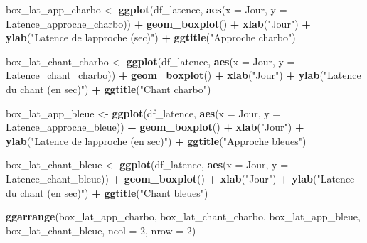 \documentclass[
  french,
]{article}
\newenvironment{Shaded}{\begin{snugshade}}{\end{snugshade}}
\newcommand{\AttributeTok}[1]{\textcolor[rgb]{0.13,0.29,0.53}{#1}}
\newcommand{\DecValTok}[1]{\textcolor[rgb]{0.00,0.00,0.81}{#1}}
\newcommand{\FunctionTok}[1]{\textcolor[rgb]{0.13,0.29,0.53}{\textbf{#1}}}
\newcommand{\NormalTok}[1]{#1}
\newcommand{\OtherTok}[1]{\textcolor[rgb]{0.56,0.35,0.01}{#1}}
\newcommand{\SpecialCharTok}[1]{\textcolor[rgb]{0.81,0.36,0.00}{\textbf{#1}}}
\newcommand{\StringTok}[1]{\textcolor[rgb]{0.31,0.60,0.02}{#1}}
\begin{document}
\begin{Shaded}
\begin{Highlighting}[]
\NormalTok{box\_lat\_app\_charbo }\OtherTok{\textless{}{-}} \FunctionTok{ggplot}\NormalTok{(df\_latence, }\FunctionTok{aes}\NormalTok{(}\AttributeTok{x =}\NormalTok{ Jour, }\AttributeTok{y =}\NormalTok{ Latence\_approche\_charbo)) }\SpecialCharTok{+}
  \FunctionTok{geom\_boxplot}\NormalTok{() }\SpecialCharTok{+}
  \FunctionTok{xlab}\NormalTok{(}\StringTok{"Jour"}\NormalTok{) }\SpecialCharTok{+}
  \FunctionTok{ylab}\NormalTok{(}\StringTok{"Latence de l\textquotesingle{}approche (sec)"}\NormalTok{) }\SpecialCharTok{+}
  \FunctionTok{ggtitle}\NormalTok{(}\StringTok{"Approche charbo"}\NormalTok{)}

\NormalTok{box\_lat\_chant\_charbo }\OtherTok{\textless{}{-}} \FunctionTok{ggplot}\NormalTok{(df\_latence, }\FunctionTok{aes}\NormalTok{(}\AttributeTok{x =}\NormalTok{ Jour, }\AttributeTok{y =}\NormalTok{ Latence\_chant\_charbo)) }\SpecialCharTok{+}
  \FunctionTok{geom\_boxplot}\NormalTok{() }\SpecialCharTok{+}
  \FunctionTok{xlab}\NormalTok{(}\StringTok{"Jour"}\NormalTok{) }\SpecialCharTok{+}
  \FunctionTok{ylab}\NormalTok{(}\StringTok{"Latence du chant (en sec)"}\NormalTok{) }\SpecialCharTok{+}
  \FunctionTok{ggtitle}\NormalTok{(}\StringTok{"Chant charbo"}\NormalTok{)}

\NormalTok{box\_lat\_app\_bleue }\OtherTok{\textless{}{-}} \FunctionTok{ggplot}\NormalTok{(df\_latence, }\FunctionTok{aes}\NormalTok{(}\AttributeTok{x =}\NormalTok{ Jour, }\AttributeTok{y =}\NormalTok{ Latence\_approche\_bleue)) }\SpecialCharTok{+}
  \FunctionTok{geom\_boxplot}\NormalTok{() }\SpecialCharTok{+}
  \FunctionTok{xlab}\NormalTok{(}\StringTok{"Jour"}\NormalTok{) }\SpecialCharTok{+}
  \FunctionTok{ylab}\NormalTok{(}\StringTok{"Latence de l\textquotesingle{}approche (en sec)"}\NormalTok{) }\SpecialCharTok{+}
  \FunctionTok{ggtitle}\NormalTok{(}\StringTok{"Approche bleues"}\NormalTok{)}

\NormalTok{box\_lat\_chant\_bleue }\OtherTok{\textless{}{-}} \FunctionTok{ggplot}\NormalTok{(df\_latence, }\FunctionTok{aes}\NormalTok{(}\AttributeTok{x =}\NormalTok{ Jour, }\AttributeTok{y =}\NormalTok{ Latence\_chant\_bleue)) }\SpecialCharTok{+}
  \FunctionTok{geom\_boxplot}\NormalTok{() }\SpecialCharTok{+}
  \FunctionTok{xlab}\NormalTok{(}\StringTok{"Jour"}\NormalTok{) }\SpecialCharTok{+}
  \FunctionTok{ylab}\NormalTok{(}\StringTok{"Latence du chant (en sec)"}\NormalTok{) }\SpecialCharTok{+}
  \FunctionTok{ggtitle}\NormalTok{(}\StringTok{"Chant bleues"}\NormalTok{)}

\FunctionTok{ggarrange}\NormalTok{(box\_lat\_app\_charbo, box\_lat\_chant\_charbo, box\_lat\_app\_bleue, box\_lat\_chant\_bleue,}
          \AttributeTok{ncol =} \DecValTok{2}\NormalTok{, }\AttributeTok{nrow =} \DecValTok{2}\NormalTok{)}
\end{Highlighting}
\end{Shaded}
\end{document}

